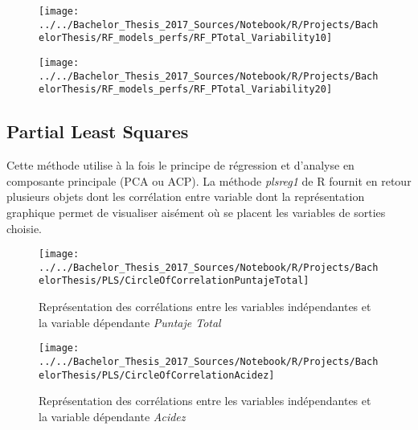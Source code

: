 \begin{figure}[H]
	\centering
	\texttt{[image: ../../Bachelor\_Thesis\_2017\_Sources/Notebook/R/Projects/BachelorThesis/RF\_models\_perfs/RF\_PTotal\_Variability10]}
	\caption{}
	\label{fig:rfptotalvariability10}
\end{figure}
\begin{figure}[H]
	\centering
	\texttt{[image: ../../Bachelor\_Thesis\_2017\_Sources/Notebook/R/Projects/BachelorThesis/RF\_models\_perfs/RF\_PTotal\_Variability20]}
	\caption{}
	\label{fig:rfptotalvariability20}
\end{figure}




















\newpage

\subsection{Partial Least Squares}
Cette méthode utilise à la fois le principe de régression et d'analyse en composante principale (PCA ou ACP). La méthode \textit{plsreg1} de R fournit en retour plusieurs objets dont les corrélation entre variable dont la représentation graphique permet de visualiser aisément où se placent les variables de sorties choisie. 

\begin{figure}[H]
	\centering
	\texttt{[image: ../../Bachelor\_Thesis\_2017\_Sources/Notebook/R/Projects/BachelorThesis/PLS/CircleOfCorrelationPuntajeTotal]}
	\caption{Représentation des corrélations entre les variables indépendantes et la variable dépendante \textit{Puntaje Total}}
	\label{fig:circleofcorrelationpuntajetotal}
\end{figure}
 
\begin{figure}[H]
	\centering
	\texttt{[image: ../../Bachelor\_Thesis\_2017\_Sources/Notebook/R/Projects/BachelorThesis/PLS/CircleOfCorrelationAcidez]}
	\caption{Représentation des corrélations entre les variables indépendantes et la variable dépendante \textit{Acidez}}
	\label{fig:circleofcorrelationacidez}
\end{figure}

